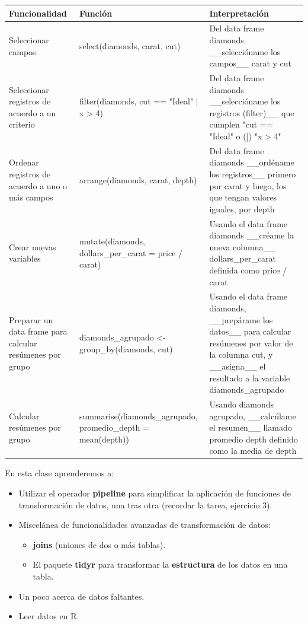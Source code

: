 \documentclass[]{book}
\providecommand{\tightlist}{%
  \setlength{\itemsep}{0pt}\setlength{\parskip}{0pt}}
\theoremstyle{definition}
\theoremstyle{definition}
\theoremstyle{definition}
\theoremstyle{remark}
\begin{document}
\begin{tabular}{l|l|l}
\hline
Funcionalidad & Función & Interpretación\\
\hline
Seleccionar campos & select(diamonds, carat, cut) & Del data frame diamonds \_\_seleccióname los campos\_\_ carat y cut\\
\hline
Seleccionar registros de acuerdo a un criterio & filter(diamonds, cut == "Ideal" | x > 4) & Del data frame diamonds \_\_seleccióname los registros (filter)\_\_ que cumplen "cut == "Ideal" o (|) "x > 4"\\
\hline
Ordenar registros de acuerdo a uno o más campos & arrange(diamonds, carat, depth) & Del data frame diamonds \_\_ordéname los registros\_\_ primero por carat y luego, los que tengan valores iguales, por depth\\
\hline
Crear nuevas variables & mutate(diamonds, dollars\_per\_carat = price / carat) & Usando el data frame diamonds \_\_créame la nueva columna\_\_ dollars\_per\_carat definida como price / carat\\
\hline
Preparar un data frame para calcular resúmenes por grupo & diamonds\_agrupado <- group\_by(diamonds, cut) & Usando el data frame diamonds, \_\_prepárame los datos\_\_ para calcular resúmenes por valor de la columna cut, y \_\_asigna\_\_ el resultado a la variable diamonds\_agrupado\\
\hline
Calcular resúmenes por grupo & summarise(diamonds\_agrupado, promedio\_depth = mean(depth)) & Usando diamonds agrupado, \_\_calcúlame el resumen\_\_ llamado promedio depth definido como la media de depth\\
\hline
\end{tabular}

En esta clase aprenderemos a:

\begin{itemize}
\tightlist
\item
  Utilizar el operador \textbf{pipeline} para simplificar la aplicación
  de funciones de transformación de datos, una tras otra (recordar la
  tarea, ejercicio 3).
\item
  Miscelánea de funcionalidades avanzadas de transformación de datos:

  \begin{itemize}
  \tightlist
  \item
    \textbf{joins} (uniones de dos o más tablas).
  \item
    El paquete \textbf{tidyr} para transformar la \textbf{estructura} de
    los datos en una tabla.
  \end{itemize}
\item
  Un poco acerca de datos faltantes.
\item
  Leer datos en R.
\end{itemize}
\end{document}

